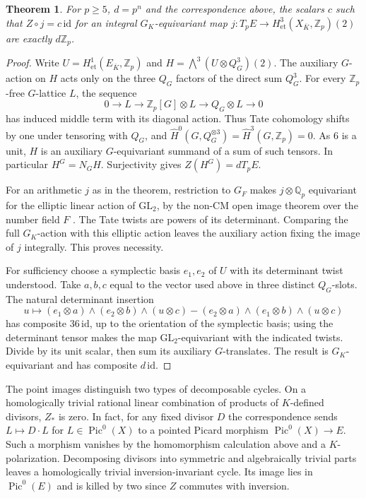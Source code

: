 \documentclass[11pt]{article}
\newtheorem{theorem}{Theorem}
\newcommand{\Z}{\mathbb Z}
\newcommand{\Q}{\mathbb Q}
\begin{document}
\begin{theorem}
For $p\ge5$, $d=p^n$ and the correspondence above, the scalars $c$
such that $Z\circ j=c\,\mathrm{id}$ for an integral
$G_K$-equivariant map $j:T_pE\to H^3_{\mathrm{et}}(X_{\overline K},\Z_p)(2)$
are exactly $d\Z_p$.
\end{theorem}
\begin{proof}
Write $U=H^1_{\mathrm{et}}(E_{\overline K},\Z_p)$ and
$H=\bigwedge^3(U\otimes Q_G^3)(2)$. The auxiliary $G$-action on $H$
acts only on the three $Q_G$ factors of the direct sum $Q_G^3$.
For every $\Z_p$-free $G$-lattice $L$, the sequence
\[
 0\longrightarrow L\longrightarrow\Z_p[G]\otimes L
 \longrightarrow Q_G\otimes L\longrightarrow0
\]
has induced middle term with its diagonal action. Thus Tate cohomology
shifts by one under tensoring with $Q_G$, and
$\widehat H^0(G,Q_G^{\otimes3})=\widehat H^3(G,\Z_p)=0$.
As $6$ is a unit, $H$ is an auxiliary $G$-equivariant summand of a sum of
such tensors. In particular $H^G=N_G H$. Surjectivity gives
$Z(H^G)=dT_pE$.

For an arithmetic $j$ as in the theorem, restriction to $G_F$ makes
$j\otimes\Q_p$ equivariant for the elliptic linear action of
$\mathrm{GL}_2$, by the non-CM open image theorem over the number
field $F$ \cite{Lombardo}. The Tate twists are powers of its
determinant. Comparing the full $G_K$-action with this elliptic
action leaves the auxiliary action fixing the image of $j$ integrally.
This proves necessity.

For sufficiency choose a symplectic basis $e_1,e_2$ of $U$ with its
determinant twist understood. Take $a,b,c$ equal to the vector used
above in three distinct $Q_G$-slots. The natural determinant insertion
\[
 u\longmapsto
 (e_1\otimes a)\wedge(e_2\otimes b)\wedge(u\otimes c)
 -(e_2\otimes a)\wedge(e_1\otimes b)\wedge(u\otimes c)
\]
has composite $36\,\mathrm{id}$, up to the orientation of the
symplectic basis; using the determinant tensor makes the map
$\mathrm{GL}_2$-equivariant with the indicated twists. Divide by its
unit scalar, then sum its auxiliary $G$-translates. The result is
$G_K$-equivariant and has composite $d\,\mathrm{id}$.
\end{proof}

The point images distinguish two types of decomposable cycles.
On a homologically trivial rational linear combination of products
of $K$-defined divisors, $Z_*$ is zero. In fact, for any fixed divisor
$D$ the correspondence sends $L\mapsto D\cdot L$ for
$L\in\operatorname{Pic}^0(X)$ to a pointed Picard morphism
$\operatorname{Pic}^0(X)\to E$. Such a morphism vanishes by the
homomorphism calculation above and a $K$-polarization. Decomposing
divisors into symmetric and algebraically trivial parts leaves
a homologically trivial inversion-invariant cycle. Its image lies in
$\operatorname{Pic}^0(E)$ and is killed by two since $Z$ commutes
with inversion.
\end{document}
